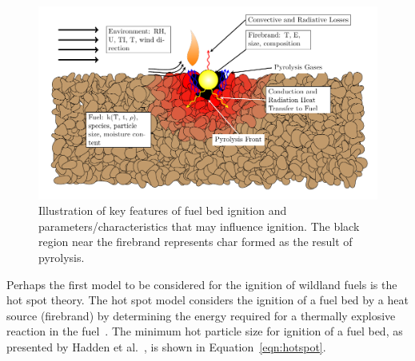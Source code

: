         \begin{figure}[hpbt]
            \centering
                \includegraphics[width=\textwidth]{Figures/dissertationBed.pdf}
            \caption{Illustration of key features of fuel bed ignition and parameters/characteristics that may influence ignition. The black region near the firebrand represents char formed as the result of pyrolysis.}
            \label{fig:ignitionDiagram}
        \end{figure}
    
    Perhaps the first model to be considered for the ignition of wildland fuels is the hot spot theory. The hot spot model considers the ignition of a fuel bed by a heat source (firebrand) by determining the energy required for a thermally explosive reaction in the fuel~\cite{Zinn1962InitiationSpots, Thomas1965}. The minimum hot particle size for ignition of a fuel bed, as presented by Hadden et al.~\cite{Hadden2011}, is shown in Equation~\ref{eqn:hotspot}. 
    
